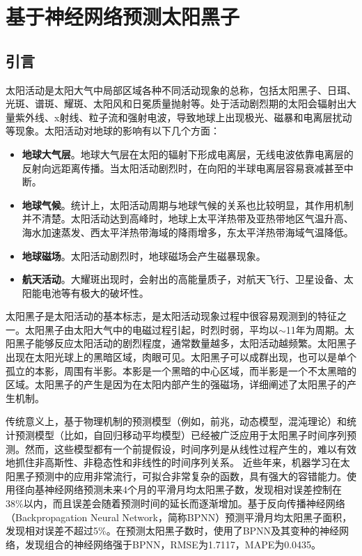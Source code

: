 \chapter{基于神经网络预测太阳黑子}\label{chap:ml_sunspot}

\section{引言}\label{sec:ss_intro}

太阳活动是太阳大气中局部区域各种不同活动现象的总称，包括太阳黑子、日珥、光斑、谱斑、耀斑、太阳风和日冕质量抛射等。处于活动剧烈期的太阳会辐射出大量紫外线、x射线、粒子流和强射电波，导致地球上出现极光、磁暴和电离层扰动等现象。太阳活动对地球的影响有以下几个方面\citep{jie2012prediction}：
\begin{itemize}
  \item \textbf{地球大气层}。地球大气层在太阳的辐射下形成电离层，无线电波依靠电离层的反射向远距离传播。当太阳活动剧烈时，在向阳的半球电离层容易衰减甚至中断。
  \item \textbf{地球气候}。统计上，太阳活动周期与地球气候的关系也比较明显，其作用机制并不清楚。太阳活动达到高峰时，地球上太平洋热带及亚热带地区气温升高、海水加速蒸发、西太平洋热带海域的降雨增多，东太平洋热带海域气温降低。
  \item \textbf{地球磁场}。太阳活动剧烈时，地球磁场会产生磁暴现象。
  \item \textbf{航天活动}。大耀斑出现时，会射出的高能量质子，对航天飞行、卫星设备、太阳能电池等有极大的破坏性。
\end{itemize}

太阳黑子是太阳活动的基本标志，是太阳活动现象过程中很容易观测到的特征之一。太阳黑子由太阳大气中的电磁过程引起，时烈时弱，平均以$\sim$11年为周期。太阳黑子能够反应太阳活动的剧烈程度，通常数量越多，太阳活动越频繁。太阳黑子出现在太阳光球上的黑暗区域，肉眼可见。太阳黑子可以成群出现，也可以是单个孤立的本影，周围有半影。本影是一个黑暗的中心区域，而半影是一个不太黑暗的区域。太阳黑子的产生是因为在太阳内部产生的强磁场，\citet{noyes2013sun}详细阐述了太阳黑子的产生机制。



传统意义上，基于物理机制的预测模型（例如，前兆，动态模型，混沌理论\citep{jie2012prediction}）和统计预测模型（比如，自回归移动平均模型）已经被广泛应用于太阳黑子时间序列预测。然而，这些模型都有一个前提假设，时间序列是从线性过程产生的，难以有效地抓住非高斯性、非稳态性和非线性的时间序列关系\citep{jiang2011sunspot,arlt2015solar}。
近些年来，机器学习在太阳黑子预测中的应用非常流行\citep{pala2019forecasting}，可拟合非常复杂的函数，具有强大的容错能力。\citet{zhao2008prediction}使用径向基神经网络预测未来4个月的平滑月均太阳黑子数，发现相对误差控制在38\%以内，而且误差会随着预测时间的延长而逐渐增加。\citet{ding2012prediction}基于反向传播神经网络（Backpropagation Neural Network，简称BPNN）预测平滑月均太阳黑子面积，发现相对误差不超过5\%。\citet{li2018hybrid}在预测太阳黑子数时，使用了BPNN及其变种的神经网络，发现组合的神经网络强于BPNN，RMSE为1.7117，MAPE为0.0435。

